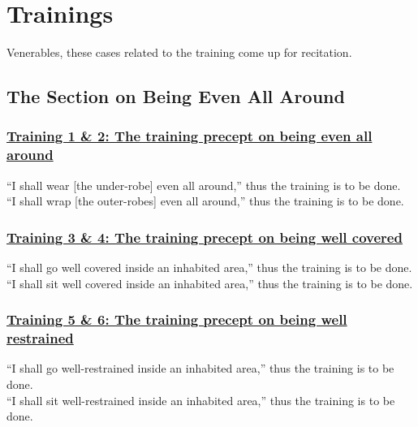 
\section{Trainings}
\label{trainings}

\begin{intro}
	Venerables, these cases related to the training come up for recitation.
\end{intro}

\setsubsecheadstyle{\subsectionFmt}
\subsection{The Section on Being Even All Around}

\subsubsection*{\hyperref[sekh1-2]{Training 1 \& 2: The training precept on being even all around}}
\label{training1-2}
``I shall wear [the under-robe] even all around,'' thus the training is to be done.\\
``I shall wrap [the outer-robes] even all around,'' thus the training is to be done.



\subsubsection*{\hyperref[sekh3-4]{Training 3 \& 4: The training precept on being well covered}}
\label{training3-4}
``I shall go well covered inside an inhabited area,'' thus the training is to be done.\\
``I shall sit well covered inside an inhabited area,'' thus the training is to be done.



\subsubsection*{\hyperref[sekh5-6]{Training 5 \& 6: The training precept on being well restrained}}
\label{training5-6}
``I shall go well-restrained inside an inhabited area,'' thus the training is to be done.\\
``I shall sit well-restrained inside an inhabited area,'' thus the training is to be done.



